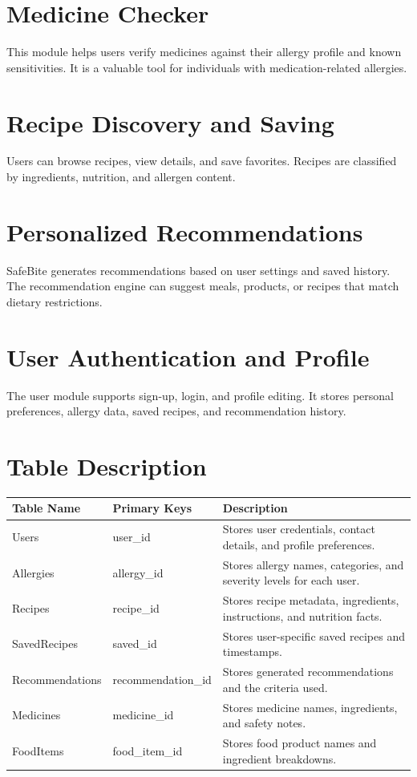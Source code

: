 \documentclass[12pt,a4paper]{report}
\begin{document}
\section{Medicine Checker}
This module helps users verify medicines against their allergy profile and known sensitivities. It is a valuable tool for individuals with medication-related allergies.

\section{Recipe Discovery and Saving}
Users can browse recipes, view details, and save favorites. Recipes are classified by ingredients, nutrition, and allergen content.

\section{Personalized Recommendations}
SafeBite generates recommendations based on user settings and saved history. The recommendation engine can suggest meals, products, or recipes that match dietary restrictions.

\section{User Authentication and Profile}
The user module supports sign-up, login, and profile editing. It stores personal preferences, allergy data, saved recipes, and recommendation history.

\section{Table Description}
\begin{longtable}{|p{4cm}|p{4cm}|p{6cm}|}
  \hline
  \textbf{Table Name} & \textbf{Primary Keys} & \textbf{Description} \\
  \hline
  Users & user_id & Stores user credentials, contact details, and profile preferences. \\
  \hline
  Allergies & allergy_id & Stores allergy names, categories, and severity levels for each user. \\
  \hline
  Recipes & recipe_id & Stores recipe metadata, ingredients, instructions, and nutrition facts. \\
  \hline
  SavedRecipes & saved_id & Stores user-specific saved recipes and timestamps. \\
  \hline
  Recommendations & recommendation_id & Stores generated recommendations and the criteria used. \\
  \hline
  Medicines & medicine_id & Stores medicine names, ingredients, and safety notes. \\
  \hline
  FoodItems & food_item_id & Stores food product names and ingredient breakdowns. \\
  \hline
\end{longtable}
\end{document}
